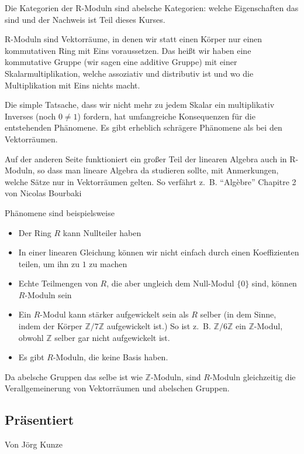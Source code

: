 \documentclass[a4paper]{amsart}
\theoremstyle{definition}
\newcommand{\Z}{\ensuremath{\mathbb{ Z }}}
\newcommand{\zz}[1]{\ensuremath{\Z /#1\Z}}
\newcommand{\zb}{z.~B. }
\begin{document}
Die Kategorien der R-Moduln sind abelsche Kategorien: welche Eigenschaften das sind und der Nachweis ist Teil dieses Kurses.

R-Moduln sind Vektorräume, in denen wir statt einen Körper nur einen kommutativen Ring mit Eins voraussetzen. Das heißt wir haben eine kommutative Gruppe (wir sagen eine additive Gruppe) mit einer Skalarmultiplikation, welche assoziativ und distributiv ist und wo die Multiplikation mit Eins nichts macht.

Die simple Tatsache, dass wir nicht mehr zu jedem Skalar ein multiplikativ Inverses (noch $0 \ne 1$) fordern, hat umfangreiche Konsequenzen für die entstehenden Phänomene. Es gibt erheblich schrägere Phänomene als bei den Vektorräumen.

Auf der anderen Seite funktioniert ein großer Teil der linearen Algebra auch in R-Moduln, so dass man lineare Algebra da studieren sollte, mit Anmerkungen, welche Sätze nur in Vektorräumen gelten. So verfährt \zb "`Algèbre"' Chapitre 2 von Nicolas Bourbaki \cite{A1-3}

Phänomene sind beispielsweise
\begin{itemize}
   \item Der Ring $R$ kann Nullteiler haben
   \item In einer linearen Gleichung können wir nicht einfach durch einen Koeffizienten teilen, um ihn zu $1$ zu machen
   \item Echte Teilmengen von $R$, die aber ungleich dem Null-Modul $\{0\}$ sind, können $R$-Moduln sein
   \item Ein $R$-Modul kann stärker aufgewickelt sein als $R$ selber (in dem Sinne, indem der Körper \zz7 aufgewickelt ist.) So ist \zb $\Z / 6 \Z$ ein $\Z$-Modul, obwohl $\Z$ selber gar nicht aufgewickelt ist.
   \item Es gibt $R$-Moduln, die keine Basis haben.
\end{itemize}

Da abelsche Gruppen das selbe ist wie $\Z$-Moduln, sind $R$-Moduln gleichzeitig die Verallgemeinerung von Vektorräumen und abelschen Gruppen.

\subsection*{Präsentiert}
Von Jörg Kunze
\end{document}
